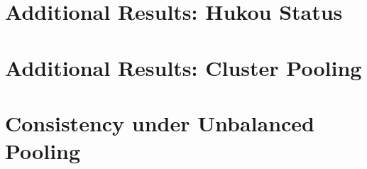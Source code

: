 \documentclass[12pt]{article}
\begin{document}
\begin{landscape}

\end{landscape}

% 
% 
% 

\begin{landscape}
     
\end{landscape}


\newpage
\section{Additional Results: Hukou Status}\label{app:temp}

\clearpage
\newpage


\newpage
\section{Additional Results: Cluster Pooling}\label{app:cluster}





\clearpage
\newpage



\section{Consistency under Unbalanced Pooling}\label{app:pooling}
\setcounter{assumption}{0}
\end{document}

